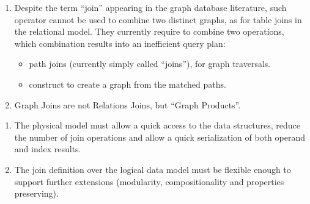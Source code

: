 
\begin{lucido}
	\begin{enumerate}
		[square]
		\item  Despite the term ``join'' appearing in the graph database literature, such operator cannot be used to combine two distinct graphs, as for table joins in the relational model. They currently require to combine two operations, which combination results into an inefficient query plan:
		\begin{itemize}
			\item \alert{path joins} (currently simply called ``joins''), for graph traversals.
			\item \alert{construct} to create a graph from the matched paths.
		\end{itemize}
		\item Graph Joins are not Relations Joins, but ``Graph Products''.
	\end{enumerate}
\end{lucido}


\begin{lucido}
	\begin{enumerate}[<+->]
		[circle]
		\item The physical model must allow a quick access to the data structures, reduce the number of join operations and allow a quick serialization of both operand and index results.
		\item The join definition over the logical data model must be flexible enough to support further extensions (modularity, compositionality and properties preserving).
	\end{enumerate}
\end{lucido}